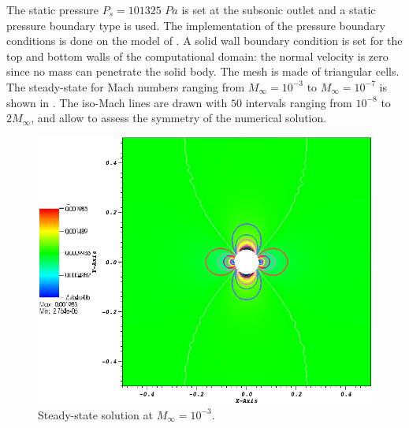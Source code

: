 The static pressure $P_s = 101325$ $Pa$ is set at the subsonic outlet and a static pressure boundary type is used. The implementation of the pressure boundary conditions is done on the model of \cite{SEM}. A solid wall boundary condition is set for the top and bottom walls of the computational domain: the normal velocity is zero since no mass can penetrate the solid body. The mesh is made of triangular cells.\\
The steady-state for Mach numbers ranging from $M_{\infty} = 10^{-3}$ to $M_{\infty} = 10^{-7}$ is shown in . The iso-Mach lines are drawn with $50$ intervals ranging from $10^{-8}$ to $2M_{\infty}$, and allow to assess the symmetry of the numerical solution.
        \begin{figure}[H]%
                \centering
                \includegraphics[scale=.50]{figures/CylinderMach1em3.png}
                \caption{Steady-state solution at $M_{\infty}=10^{-3}$.}
                \label{fig:cyl_1em3}
        \end{figure}%
          
